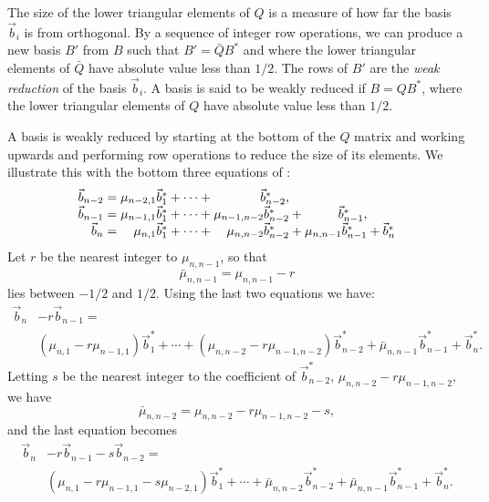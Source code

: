 The size of the lower triangular elements of $Q$ is a measure of how
far the basis $\vec{b}_i$ is from orthogonal.  By a sequence of
integer row operations, we can produce a new basis $B'$ from $B$ such
that $B' = \bar{Q} B^{\ast}$ and where the lower triangular elements of
$\bar{Q}$ have absolute value less than $1/2$.  The rows of $B'$ are
the {\em weak reduction} of the basis $\vec{b}_i$.  A basis is said
to be weakly reduced if $B = QB^{\ast}$, where the lower triangular
elements of $Q$ have absolute value less than $1/2$.

A basis is weakly reduced by starting at the bottom of the $Q$ matrix
and working upwards and performing row operations to reduce the size
of its elements.  We illustrate this with the bottom three equations
of :
\[ {\arraycolsep=0pt
\begin{array}{rcrcrcrcr}
\vec{b}_{n-2} & \null = \null 
  & \mu_{n-2, 1} \vec{b}^{\ast}_1
  & \null + \cdots + \null 
  & \vec{b}^{\ast}_{n-2},\\
\vec{b}_{n-1} & \null = \null 
  & \mu_{n-1, 1} \vec{b}^{\ast}_1
  & \null + \cdots + \null
  & \mu_{n-1, n-2} \vec{b}^{\ast}_{n-2}& \null + \null
  & \vec{b}^{\ast}_{n-1}, \\
\vec{b}_{n} & \null = \null
  & \mu_{n, 1} \vec{b}^{\ast}_1
  & \null + \cdots + \null
  & \mu_{n, n-2} \vec{b}^{\ast}_{n-2}& \null + \null
  & \mu_{n, n-1} \vec{b}^{\ast}_{n-1}& \null + \null
  & \vec{b}^{\ast}_n
\end{array}}
\]
Let $r$ be the nearest integer to $\mu_{n,n-1}$, so that
\[
\bar{\mu}_{n,n-1} = \mu_{n,n-1} - r
\]
lies between $-1/2$ and $1/2$.  Using the last two equations we have:
\[
\begin{aligned}
  \vec{b}_n &- r \vec{b}_{n-1} = \\
  & (\mu_{n, 1} - r\mu_{n-1, 1}) \vec{b}^{\ast}_1 + \cdots + 
    (\mu_{n, n-2} - r \mu_{n-1,n-2})\vec{b}^{\ast}_{n-2} + 
    \bar{\mu}_{n, n-1} \vec{b}^{\ast}_{n-1} + 
    \vec{b}^{\ast}_n.
\end{aligned}
\]
Letting $s$ be the nearest integer to the coefficient of
$\vec{b}^{\ast}_{n-2}$,  $\mu_{n, n-2} - r
\mu_{n-1,n-2}$, we have
\[
\bar{\mu}_{n,n-2} = \mu_{n, n-2} - r \mu_{n-1,n-2} - s,
\]
and the last equation becomes
\[
\begin{aligned}
\vec{b}_n & - r \vec{b}_{n-1} - s \vec{b}_{n-2} = \\
  & (\mu_{n, 1} - r\mu_{n-1, 1} - s\mu_{n-2, 1}) \vec{b}^{\ast}_1 + \cdots + 
  \bar{\mu}_{n, n-2}\vec{b}^{\ast}_{n-2} + 
  \bar{\mu}_{n, n-1} \vec{b}^{\ast}_{n-1} + 
  \vec{b}^{\ast}_n.
\end{aligned}
\]

